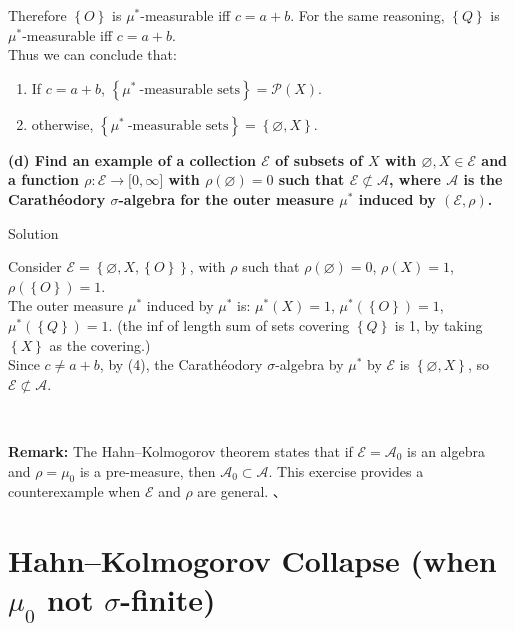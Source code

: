 \documentclass{qlnotes-export}
\begin{document}
Therefore \(\left\{ O \right\}\) is \(\mu^{\ast}\)-measurable iff \(c = a + b\). For the same reasoning, \(\left\{ Q \right\}\) is \(\mu^{\ast}\)-measurable iff \(c = a + b\).\\
Thus we can conclude that:

\begin{enumerate}
\item
  If \(c = a + b\), \(\left\{ {\mu^{\ast}\ \text{-measurable sets}} \right\} = \mathcal{P}(X)\).
\item
  otherwise, \(\left\{ {\mu^{\ast}\ \text{-measurable sets}} \right\} = \left\{ {\varnothing,X} \right\}\).
\end{enumerate}

\textbf{(d) Find an example of a collection \(\mathcal{E}\) of subsets of \(X\) with \(\varnothing,X \in \mathcal{E}\) and a function \(\rho:\mathcal{E}\rightarrow\lbrack 0,\infty\rbrack\) with \(\rho(\varnothing) = 0\) such that \(\mathcal{E} \not\subset \mathcal{A}\), where \(\mathcal{A}\) is the Carathéodory \(\sigma\)-algebra for the outer measure \(\mu^{\ast}\) induced by \((\mathcal{E},\rho)\).}

\begin{qlsolution}{Solution}

Consider \(\mathcal{E} = \left\{ {\varnothing,X,\left\{ O \right\}} \right\}\), with \(\rho\) such that \(\rho(\varnothing) = 0\), \(\rho(X) = 1\), \(\rho(\left\{ O \right\}) = 1\).\\
The outer measure \(\mu^{\ast}\) induced by \(\mu^{\ast}\) is: \(\mu^{\ast}(X) = 1\), \(\mu^{\ast}(\left\{ O \right\}) = 1\), \(\mu^{\ast}(\left\{ Q \right\}) = 1\). (the inf of length sum of sets covering \(\left\{ Q \right\}\) is 1, by taking \(\left\{ X \right\}\) as the covering.)\\
Since \(c \neq a + b\), by (4), the Carathéodory \(\sigma\)-algebra by \(\mu^{\ast}\) by \(\mathcal{E}\) is \(\left\{ {\varnothing,X} \right\}\), so \(\mathcal{E} \not\subset \mathcal{A}\).\\
\strut \\

\end{qlsolution}

\textbf{Remark:} The Hahn--Kolmogorov theorem states that if \(\mathcal{E} = \mathcal{A}_{0}\) is an algebra and \(\rho = \mu_{0}\) is a pre-measure, then \(\mathcal{A}_{0} \subset \mathcal{A}\). This exercise provides a counterexample when \(\mathcal{E}\) and \(\rho\) are general. 、

\section{\texorpdfstring{Hahn--Kolmogorov Collapse (when \(\mu_{0}\) not \(\sigma\)-finite)}{Hahn--Kolmogorov Collapse (when \textbackslash mu\_\{0\} not \textbackslash sigma-finite)}}\label{hahnkolmogorov-collapse-when-mu_0-not-sigma-finite}
\end{document}
